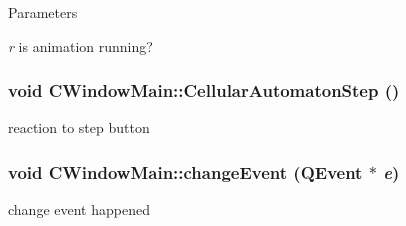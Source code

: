 \begin{DoxyParams}{Parameters}
\item[{\em r}]is animation running? \end{DoxyParams}
\hypertarget{classCWindowMain_a80a09b310e8041ee07ffa00db45aa56a}{
\subsubsection[{CellularAutomatonStep}]{\setlength{\rightskip}{0pt plus 5cm}void CWindowMain::CellularAutomatonStep ()}}
\label{classCWindowMain_a80a09b310e8041ee07ffa00db45aa56a}
reaction to step button \hypertarget{classCWindowMain_a3093f6da18ce5571d3461f03c725a37e}{
\subsubsection[{changeEvent}]{\setlength{\rightskip}{0pt plus 5cm}void CWindowMain::changeEvent (QEvent $\ast$ {\em e})}}
\label{classCWindowMain_a3093f6da18ce5571d3461f03c725a37e}
change event happened


